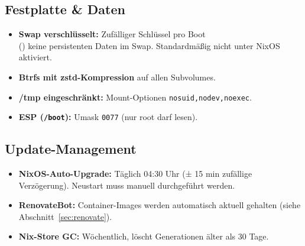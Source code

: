 \subsection{Festplatte \& Daten}
\begin{itemize}
  \item \textbf{Swap verschlüsselt:} Zufälliger Schlüssel pro Boot \\
  (\texttt{}) keine persistenten Daten im Swap. Standardmäßig nicht unter NixOS aktiviert.
  \item \textbf{Btrfs mit zstd-Kompression} auf allen Subvolumes.
  \item \textbf{/tmp eingeschränkt:} Mount-Optionen \texttt{nosuid,nodev,noexec}.
  \item \textbf{\acs{ESP} (\texttt{/boot}):} Umask \texttt{0077} (nur root darf lesen). 
\end{itemize}

\subsection{Update-Management}

\begin{itemize}
  \item \textbf{NixOS-Auto-Upgrade:} Täglich 04:30 Uhr (± 15 min zufällige Verzögerung). Neustart muss manuell durchgeführt werden.
  \item \textbf{RenovateBot:} Container-Images werden automatisch aktuell gehalten (siehe Abschnitt~\ref{sec:renovate}).
  \item \textbf{Nix-Store GC:} Wöchentlich, löscht Generationen älter als 30 Tage.
\end{itemize}